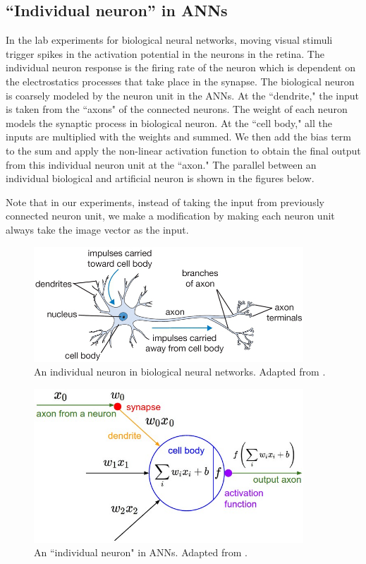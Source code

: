  \subsection{``Individual neuron'' in ANNs}
 In the lab experiments for biological neural networks, moving visual stimuli trigger spikes in the activation potential in the neurons in the retina. The individual neuron response is the firing rate of the neuron which is dependent on the  electrostatics processes that take place in the synapse. The biological neuron is coarsely modeled by the neuron unit in the ANNs. At the ``dendrite," the input is taken from the ``axons" of the connected neurons. The weight of each neuron models the synaptic process in biological neuron. At the ``cell body," all the inputs are multiplied with the weights and summed. We then add the bias term to the sum and apply the non-linear activation function to obtain the final output from this individual neuron unit at the ``axon." The parallel between an individual biological and artificial neuron is shown in the figures below. 
 
 Note that in our experiments, instead of taking the input from previously connected neuron unit, we make a modification by making each neuron unit always take the image vector as the input.
 
  \begin{figure}[H]
        \centering
            \includegraphics[width=0.9\textwidth]{figures/artificial/neuron.png}
            \caption{An individual neuron in biological neural networks. Adapted from \cite{cs231n}.}
    \end{figure}
     \begin{figure}[H]
        \centering
            \includegraphics[width=0.9\textwidth]{figures/artificial/neuron_model.jpeg}
            \caption{An ``individual neuron" in ANNs. Adapted from \cite{cs231n}.}
    \end{figure}
    
